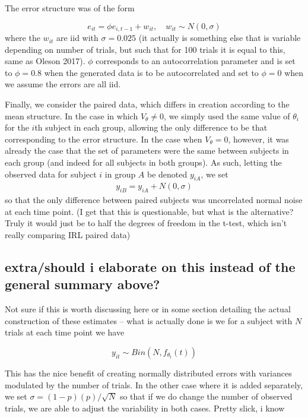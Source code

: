 \documentclass{article}
\begin{document}
The error structure was of the form

\begin{equation}
e_{it} = \phi e_{i, t-1} + w_{it}, \quad w_{it} \sim N(0, \sigma)
\end{equation}
where the $w_{it}$ are iid with $\sigma = 0.025$ (it actually is something else that is variable depending on number of trials, but such that for 100 trials it is equal to this, same as Oleson 2017). $\phi$ corresponds to an autocorrelation parameter and is set to $\phi = 0.8$ when the generated data is to be autocorrelated and set to $\phi = 0$ when we assume the errors are all iid. 

Finally, we consider the paired data, which differs in creation according to the mean structure. In the case in which $V_{\theta} \not= 0$, we simply used the same value of $\theta_i$ for the $i$th subject in each group, allowing the only difference to be that corresponding to the error structure. In the case when $V_{\theta} = 0$, however, it was already the case that the set of parameters were the same between subjects in each group (and indeed for all subjects in both groups). As such, letting the observed data for subject $i$ in group $A$ be denoted $y_{iA}$, we set
\begin{align*}
y_{iB} = y_{iA} + N(0, \sigma)
\end{align*}
so that the only difference between paired subjects was uncorrelated normal noise at each time point. (I get that this is questionable, but what is the alternative? Truly it would just be to half the degrees of freedom in the t-test, which isn't really comparing IRL paired data)

\subsection{extra/should i elaborate on this instead of the general summary above?}

Not sure if this is worth discussing here or in some section detailing the actual construction of these estimates -- what is actually done is we for a subject with $N$ trials at each time point we have

\begin{equation}
y_{it} \sim Bin(N, f_{\theta_t}(t))
\end{equation}

This has the nice benefit of creating normally distributed errors with variances modulated by the number of trials. In the other case where it is added separately, we set $\sigma = (1-p)(p)/\sqrt{N}$ so that if we do change the number of observed trials, we are able to adjust the variability in both cases.        Pretty slick, i know
\end{document}
